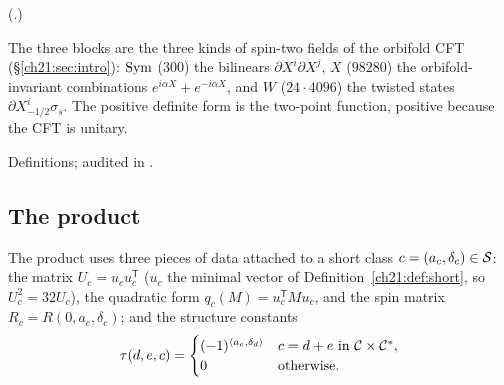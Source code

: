 (.)
\begin{physics}
The three blocks are the three kinds of spin-two fields of the orbifold CFT (\S\ref{ch21:sec:intro}):
$\mathrm{Sym}$ ($300$) the bilinears $\partial X^i\partial X^j$, $X$ ($98280$) the orbifold-invariant
combinations $e^{i\alpha X}+e^{-i\alpha X}$, and $W$ ($24\cdot4096$) the twisted states
$\partial X^i_{-1/2}\sigma_s$.  The positive definite form is the two-point function, positive because
the CFT is unitary.
\end{physics}
\begin{status}
Definitions;  audited in .
\end{status}

\subsection{The product}

The product uses three pieces of data attached to a short class $c=(a_c,\delta_c)\in\mathcal{S}$: the
matrix $U_c=u_cu_c^{\mathsf T}$ ($u_c$ the minimal vector of Definition~\ref{ch21:def:short}, so
$U_c^2=32U_c$), the quadratic form $q_c(M)=u_c^{\mathsf T}Mu_c$, and the spin matrix
$R_c=R(0,a_c,\delta_c)$; and the structure constants
\begin{equation*}
  \tau(d,e,c)=\begin{cases}(-1)^{\langle a_e,\delta_d\rangle}&c=d+e\ \text{in }\mathcal{C}\times\mathcal{C}^*,\\
  0&\text{otherwise.}\end{cases}
\end{equation*}

